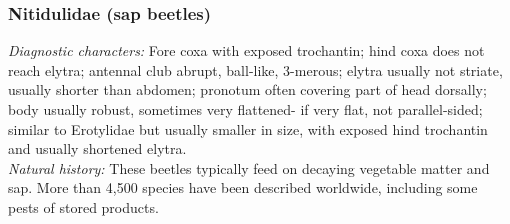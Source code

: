 \documentclass[letterpaper, 11pt]{article}
\begin{document}
\subsubsection{Nitidulidae (sap beetles)}
\noindent{}\textit{Diagnostic characters:} Fore coxa with exposed trochantin; hind coxa does not reach elytra; antennal club abrupt, ball-like, 3-merous; elytra usually not striate, usually shorter than abdomen; pronotum often covering part of head dorsally; body usually robust, sometimes very flattened- if very flat, not parallel-sided; similar to Erotylidae but usually smaller in size, with exposed hind trochantin and usually shortened elytra.\\

\noindent{}\textit{Natural history:} These beetles typically feed on decaying vegetable matter and sap. More than 4,500 species have been described worldwide, including some pests of stored products.
\end{document}
